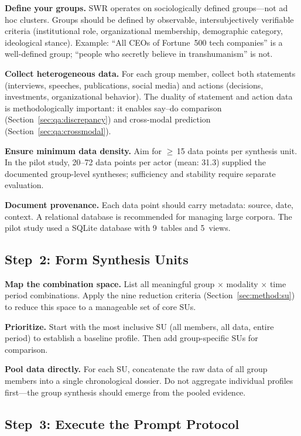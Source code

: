 \documentclass[11pt,a4paper]{article}
\begin{document}
\textbf{Define your groups.} SWR operates on sociologically defined groups---not ad hoc clusters. Groups should be defined by observable, intersubjectively verifiable criteria (institutional role, organizational membership, demographic category, ideological stance). Example: ``All CEOs of Fortune~500 tech companies'' is a well-defined group; ``people who secretly believe in transhumanism'' is not.

\textbf{Collect heterogeneous data.} For each group member, collect both statements (interviews, speeches, publications, social media) and actions (decisions, investments, organizational behavior). The duality of statement and action data is methodologically important: it enables say--do comparison (Section~\ref{sec:qa:discrepancy}) and cross-modal prediction (Section~\ref{sec:qa:crossmodal}).

\textbf{Ensure minimum data density.} Aim for $\geq$\,15 data points per synthesis unit. In the pilot study, 20--72 data points per actor (mean: 31.3) supplied the documented group-level syntheses; sufficiency and stability require separate evaluation.

\textbf{Document provenance.} Each data point should carry metadata: source, date, context. A relational database is recommended for managing large corpora. The pilot study used a SQLite database with 9~tables and 5~views.

\subsection{Step~2: Form Synthesis Units}
\label{sec:app:step2}

\textbf{Map the combination space.} List all meaningful group $\times$ modality $\times$ time period combinations. Apply the nine reduction criteria (Section~\ref{sec:method:su}) to reduce this space to a manageable set of core SUs.

\textbf{Prioritize.} Start with the most inclusive SU (all members, all data, entire period) to establish a baseline profile. Then add group-specific SUs for comparison.

\textbf{Pool data directly.} For each SU, concatenate the raw data of all group members into a single chronological dossier. Do not aggregate individual profiles first---the group synthesis should emerge from the pooled evidence.

\subsection{Step~3: Execute the Prompt Protocol}
\label{sec:app:step3}
\end{document}
